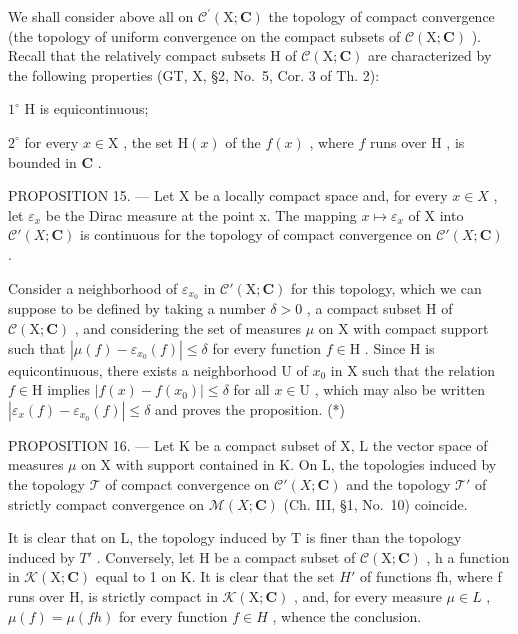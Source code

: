 We shall consider above all on \(\mathcal{C}^{\prime}(\mathrm{X};\mathbf{C})\) the topology of compact convergence (the topology of uniform convergence on the compact subsets of \(\mathcal{C}(\mathrm{X};\mathbf{C})\) ). Recall that the relatively compact subsets H of \(\mathcal{C}(\mathrm{X};\mathbf{C})\) are characterized by the following properties (GT, X, §2, No.~5, Cor. 3 of Th. 2):

\(1^{\circ}\) H is equicontinuous;

\(2^{\circ}\) for every \(x \in \mathrm{X}\) , the set \(\mathrm{H}(x)\) of the \(f(x)\) , where \(f\) runs over \(\mathrm{H}\) , is bounded in \(\mathbf{C}\) .

PROPOSITION 15. --- Let X be a locally compact space and, for every \(x \in X\) , let \(\varepsilon_{x}\) be the Dirac measure at the point x. The mapping \(x \mapsto \varepsilon_{x}\) of X into \(\mathcal{C}'(X; \mathbf{C})\) is continuous for the topology of compact convergence on \(\mathcal{C}'(X; \mathbf{C})\) .

Consider a neighborhood of \(\varepsilon_{x_0}\) in \(\mathcal{C}'(\mathrm{X};\mathbf{C})\) for this topology, which we can suppose to be defined by taking a number \(\delta > 0\) , a compact subset \(\mathrm{H}\) of \(\mathcal{C}(\mathrm{X};\mathbf{C})\) , and considering the set of measures \(\mu\) on \(\mathrm{X}\) with compact support such that \(|\mu(f) - \varepsilon_{x_0}(f)| \leqslant \delta\) for every function \(f \in \mathrm{H}\) . Since \(\mathrm{H}\) is equicontinuous, there exists a neighborhood \(\mathrm{U}\) of \(x_0\) in \(\mathrm{X}\) such that the relation \(f \in \mathrm{H}\) implies \(|f(x) - f(x_0)| \leqslant \delta\) for all \(x \in \mathrm{U}\) , which may also be written \(|\varepsilon_x(f) - \varepsilon_{x_0}(f)| \leqslant \delta\) and proves the proposition. (*)

PROPOSITION 16. --- Let K be a compact subset of X, L the vector space of measures \(\mu\) on X with support contained in K. On L, the topologies induced by the topology \(\mathcal{T}\) of compact convergence on \(\mathcal{C}'(X; \mathbf{C})\) and the topology \(\mathcal{T}'\) of strictly compact convergence on \(\mathcal{M}(X; \mathbf{C})\) (Ch. III, §1, No.~10) coincide.

It is clear that on L, the topology induced by T is finer than the topology induced by \(T'\) . Conversely, let H be a compact subset of \(\mathcal{C}(\mathrm{X};\mathbf{C})\) , h a function in \(\mathcal{K}(\mathrm{X};\mathbf{C})\) equal to 1 on K. It is clear that the set \(H'\) of functions fh, where f runs over H, is strictly compact in \(\mathcal{K}(\mathrm{X};\mathbf{C})\) , and, for every measure \(\mu\in L\) , \(\mu(f)=\mu(fh)\) for every function \(f\in H\) , whence the conclusion.

